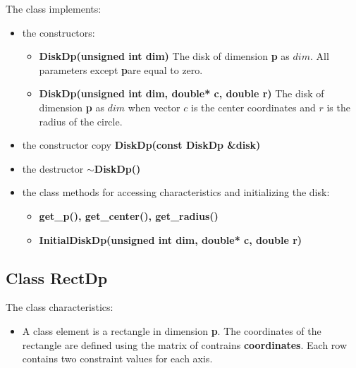\documentclass{report}
\begin{document}
	The class implements:
		\begin{itemize}	
			\item the constructors:
			\begin{itemize}
				\item {\bfseries DiskDp(unsigned int dim)} 
				The disk of dimension {\bfseries p} as  $dim$. All parameters except {\bfseries p}are equal to zero. 
				\item {\bfseries DiskDp(unsigned int dim, double* c, double r)} 
				The disk of dimension {\bfseries p} as  $dim$ when vector $c$ is the center coordinates and $r$ is  the radius of the circle.
			\end{itemize}	
		\item the constructor copy {\bfseries DiskDp(const DiskDp \&disk)} 
		\item the destructor {\bfseries  $\sim$DiskDp()}	
		\item  the class methods for accessing characteristics and initializing the disk:	
		\begin{itemize}
			\item {\bfseries get\_p(), get\_center(), get\_radius()}	
			\item {\bfseries InitialDiskDp(unsigned int dim, double* c, double r) }
		\end{itemize}
	\end{itemize} 
		
	\subsection*{Class RectDp}
	\label{RectDp}
	
	The class characteristics: 
	\begin{itemize}
		\item A class element is a rectangle in dimension {\bfseries p}. The coordinates of the rectangle are defined using the matrix of contrains {\bfseries coordinates}. Each row contains two constraint values for each axis.
	\end{itemize}
	
\end{document}
